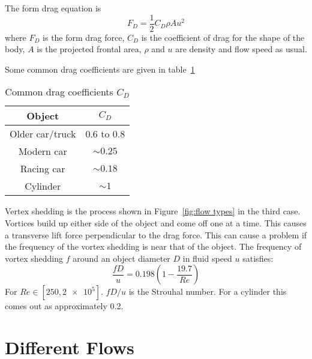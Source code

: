\documentclass{article}
\begin{document}
    The form drag equation is
    \[F_D=\frac{1}{2}C_D\rho Au^2\]
    where \(F_D\) is the form drag force, \(C_D\) is the coefficient of drag for the shape of the body, 
    \(A\) is the projected frontal area, \(\rho\) and \(u\) are density and flow speed as usual.
    
    Some common drag coefficients are given in table~\ref{tab:common drag coefficients}
    \begin{table}[ht]
        \centering
        \begin{tabular}{c|c}
            Object & \(C_D\) \\ \hline
            Older car/truck & 0.6 to 0.8\\
            Modern car & \(\sim 0.25\)\\
            Racing car & \(\sim 0.18\)\\
            Cylinder & \(\sim 1\)
        \end{tabular}
        \caption{Common drag coefficients \(C_D\)}
        \label{tab:common drag coefficients}
    \end{table}

    Vertex shedding is the process shown in Figure~\ref{fig:flow types} in the third case. 
    Vortices build up either side of the object and come off one at a time. 
    This causes a transverse lift force perpendicular to the drag force. 
    This can cause a problem if the frequency of the vortex shedding is near that of the object.
    The frequency of vortex shedding \(f\) around an object diameter \(D\) in fluid speed \(u\) satisfies:
    \[\frac{fD}{u}=0.198\left(1-\frac{19.7}{Re}\right)\]
    For \(Re\in[250, \num{2e5}]\). 
    \(fD/u\) is the Strouhal number. 
    For a cylinder this comes out as approximately 0.2. 

    \section{Different Flows}
    
\end{document}
